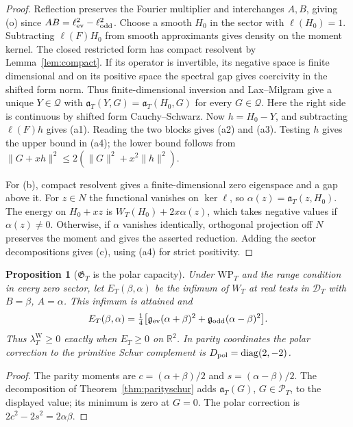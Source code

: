 \documentclass[10pt]{amsart}
\newtheorem{proposition}[theorem]{Proposition}
\theoremstyle{definition}
\theoremstyle{remark}
\newcommand{\R}{\mathbb R}
\newcommand{\PT}{\mathcal P_T}
\newcommand{\lamW}{\lambda^{\mathrm W}_T}
\begin{document}
\begin{proof}
Reflection preserves the Fourier multiplier and interchanges $A,B$,
giving (o) since $AB=\ell_{\rm ev}^2-\ell_{\rm odd}^2$. Choose
a smooth $H_0$ in the sector with $\ell(H_0)=1$. Subtracting
$\ell(F)H_0$ from smooth approximants gives density on the moment
kernel. The closed restricted form has compact resolvent by
Lemma~\ref{lem:compact}. If its operator is invertible, its negative
space is finite dimensional and on its positive space the spectral gap
gives coercivity in the shifted form norm. Thus finite-dimensional
inversion and Lax--Milgram give a unique $Y\in\mathcal Q$ with
$\mathfrak a_T(Y,G)=\mathfrak a_T(H_0,G)$ for every $G\in\mathcal Q$.
Here the right side is continuous by shifted form Cauchy--Schwarz.
Now $h=H_0-Y$, and subtracting $\ell(F)h$ gives (a1). Reading the
two blocks gives (a2) and (a3). Testing $h$ gives the upper bound
in (a4); the lower bound follows from
$\|G+xh\|^2\le2(\|G\|^2+x^2\|h\|^2)$.

For (b), compact resolvent gives a finite-dimensional zero eigenspace
and a gap above it. For $z\in N$ the functional vanishes on $\ker\ell$,
so $\alpha(z)=\mathfrak a_T(z,H_0)$. The energy on $H_0+xz$ is
$W_T(H_0)+2x\alpha(z)$, which takes negative values if $\alpha(z)\ne0$.
Otherwise, if $\alpha$ vanishes identically, orthogonal projection off
$N$ preserves the moment and gives the asserted reduction. Adding the
sector decompositions gives (c), using (a4) for strict positivity.
\end{proof}

\begin{proposition}[$\mathfrak G_T$ is the polar capacity]\label{prop:polarcap}
Under $\mathrm{WP}_T$ and the range condition in every zero sector,
let $E_T(\beta,\alpha)$ be the infimum of $W_T$ at real tests in
$\mathcal D_T$ with $B=\beta$, $A=\alpha$. This infimum is attained and
\[
 E_T(\beta,\alpha)=\tfrac14\bigl[\mathfrak g_{\rm ev}(\alpha+\beta)^2+
 \mathfrak g_{\rm odd}(\alpha-\beta)^2\bigr].
\]
Thus $\lamW\ge0$ exactly when $E_T\ge0$ on $\R^2$. In parity
coordinates the polar correction to the primitive Schur complement
is $D_{\rm pol}=\operatorname{diag}(2,-2)$.
\end{proposition}
\begin{proof}
The parity moments are $c=(\alpha+\beta)/2$ and $s=(\alpha-\beta)/2$.
The decomposition of Theorem~\ref{thm:parityschur} adds
$\mathfrak a_T(G)$, $G\in\PT$, to the displayed value; its minimum
is zero at $G=0$. The polar correction is $2c^2-2s^2=2\alpha\beta$.
\end{proof}
\end{document}

